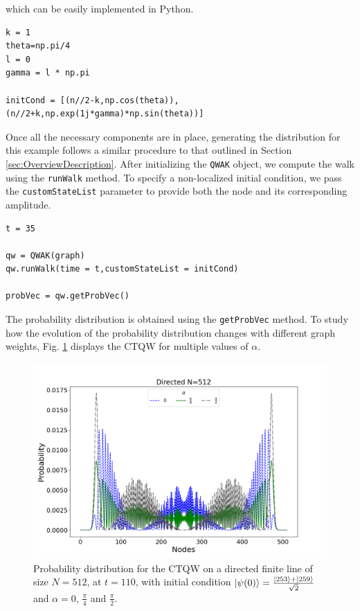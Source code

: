 \documentclass[main.tex]{subfiles}
\begin{document}
which can be easily implemented in Python. 

\begin{lstlisting}[style=code,escapeinside={__}]
k = 1
theta=np.pi/4
l = 0
gamma = l * np.pi

initCond = [(n//2-k,np.cos(theta)),(n//2+k,np.exp(1j*gamma)*np.sin(theta))]
\end{lstlisting}

Once all the necessary components are in place, generating the distribution for
this example follows a similar procedure to that outlined in Section
\ref{sec:OverviewDescription}. After initializing the \texttt{QWAK} object, we
compute the  walk using the \texttt{runWalk} method. To specify a
non-localized initial condition, we pass the \texttt{customStateList} parameter
to provide both the node and its corresponding amplitude.

\begin{lstlisting}[style=code,escapeinside={__}]
t = 35

qw = QWAK(graph)
qw.runWalk(time = t,customStateList = initCond)

probVec = qw.getProbVec()
\end{lstlisting}

The probability distribution is obtained using the \texttt{getProbVec} method. To
study how the evolution of the probability distribution changes with different
graph weights, Fig. \ref{fig:multipleAlphaOrientedDynamics} displays the CTQW
for multiple values of $\alpha$.

\begin{figure}[!h]
    \centering
    \includegraphics[scale=\mysinglefigurescale]{img/QWAK/OrientedDynamics/orDynN512NW3Alpha0.79-1.57TMAX110.png}
    \caption{Probability distribution for the CTQW on a 
        directed finite line of size $N=512$, at $t=110$, with initial condition  $\ket{\psi(0)}=\frac{\ket{253}+\ket{259}}{\sqrt{2}}$
    and $\alpha = 0$, $\frac{\pi}{4}$ and $\frac{\pi}{2}$.}
    \label{fig:multipleAlphaOrientedDynamics}
\end{figure}
\end{document}
